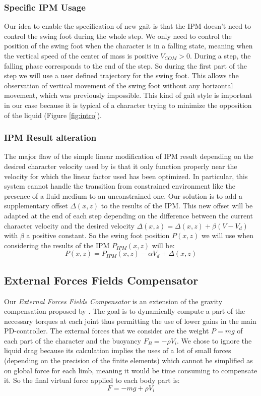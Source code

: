\documentclass[conference]{acmsiggraph}
\begin{document}
\subsubsection{Specific IPM Usage}
\label{sec:specific_ipm}

Our idea to enable the specification of new gait is that the IPM doesn't need to control the swing foot during the whole step. We only need to control the position of the swing foot when the character is in a falling state, meaning when the vertical speed of the center of mass is positive $V_{COM}>0$. During a step, the falling phase corresponds to the end of the step. So during the first part of the step we will use a user defined trajectory for the swing foot. This allows the observation of vertical movement of the swing foot without any horizontal movement, which was previously impossible. This kind of gait style is important in our case because it is typical of a character trying to minimize the opposition of the liquid (Figure \ref{fig:intro}).



\subsubsection{IPM Result alteration}
\label{sec:ipm_alt}


The major flaw of the simple linear modification of IPM result depending on the desired character velocity used by \cite{coros2010generalized} is that it only function properly near the velocity for which the linear factor used has been optimized. In particular, this system cannot handle the transition from constrained environment like the presence of a fluid medium to an unconstrained one. Our solution is to add a supplementary offset $\Delta(x,z)$ to the results of the IPM. This new offset will be adapted at the end of each step depending on the difference between the current character velocity and the desired velocity $\Delta(x,z) = \Delta(x,z)+\beta(V-V_d)$ with $\beta$ a positive constant. So the swing foot position $P(x,z)$ we will use when considering the results of the IPM $P_{IPM}(x,z)$ will be:
$$
P(x,z) = P_{IPM}(x,z) - \alpha V_d + \Delta(x,z)
$$ 

\subsection{External Forces Fields Compensator}
\label{sec:ext_force_comp}

Our \textit{ External Forces Fields Compensator} is an extension of the gravity compensation proposed by \cite{coros2010generalized}. The goal is to dynamically compute a part of the necessary torques at each joint thus permitting the use of lower gains in the main PD-controller. The external forces that we consider are the weight $P=mg$ of each part of the character and the buoyancy $F_B=-\rho V_i$. We chose to ignore the liquid drag because its calculation implies the uses of a lot of small forces (depending on the precision of the finite elements) which cannot be simplified as on global force for each limb, meaning it would be time consuming to compensate it. So the final virtual force applied to each body part is:
$$
F=-mg+\rho V_i
$$
\end{document}

